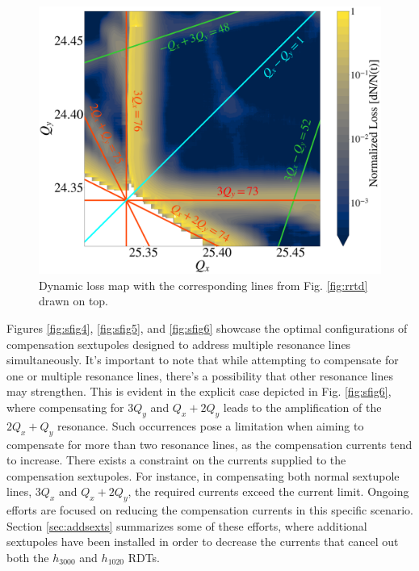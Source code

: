 \begin{figure}[H]
    \centering
    \includegraphics[width=\columnwidth]{chapter4/bare_comments.png}
    \caption{Dynamic loss map with the corresponding lines from Fig. \ref{fig:rrtd} drawn on top.}
    \label{fig:bare_comments}
\end{figure}

Figures \ref{fig:sfig4}, \ref{fig:sfig5}, and \ref{fig:sfig6} showcase the optimal configurations of compensation sextupoles designed to address multiple resonance lines simultaneously. It's important to note that while attempting to compensate for one or multiple resonance lines, there's a possibility that other resonance lines may strengthen. This is evident in the explicit case depicted in Fig. \ref{fig:sfig6}, where compensating for $3Q_y$ and $Q_x+2Q_y$ leads to the amplification of the $2Q_x+Q_y$ resonance. Such occurrences pose a limitation when aiming to compensate for more than two resonance lines, as the compensation currents tend to increase. There exists a constraint on the currents supplied to the compensation sextupoles. For instance, in compensating both normal sextupole lines, $3Q_x$ and $Q_x+2Q_y$, the required currents exceed the current limit. Ongoing efforts are focused on reducing the compensation currents in this specific scenario. Section \ref{sec:addsexts} summarizes some of these efforts, where additional sextupoles have been installed in order to decrease the currents that cancel out both the $h_{3000}$ and $h_{1020}$ RDTs.

